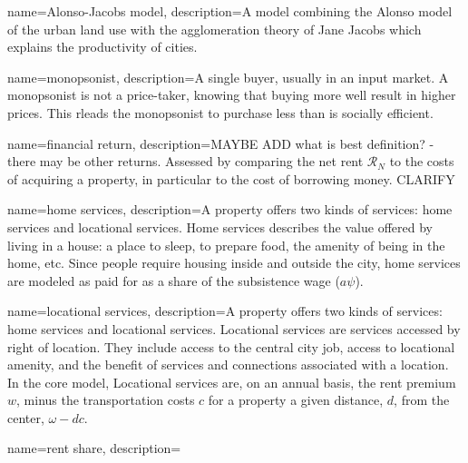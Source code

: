 
{
name=Alonso-Jacobs model,
description={A model combining the \gls{Alonso model} of the urban land use  \cite{alonsoModelUrbanLand1960} with the \gls{agglomeration} theory of Jane Jacobs \cite{jacobsEconomyCities1969} which explains the productivity of cities.}
}

{
name=monopsonist,
description={A single buyer, usually in an input market. A monopsonist is not a price-taker, knowing that buying more well result in  higher prices. This rleads the monopsonist to purchase less than is socially efficient.}
}

{
name=financial return,
description={MAYBE ADD what is best definition? - there may be other returns. Assessed by comparing the net rent $\mathcal{R}_N$ to the costs of acquiring a property, in particular to the cost of borrowing money. CLARIFY}
}

{
name=home services,
description={A property offers two kinds of services: home services and \gls{locational services}. Home services describes the value offered by living in a house: a place to sleep, to prepare food, the amenity of being in the home, etc. Since people require housing inside and outside the city, home services are modeled as paid for as a share of the subsistence wage ($a \psi$).}
}

{
name=locational services,
description={A property offers two kinds of services: \gls{home services} and locational services. Locational services are services accessed by right of location. They include access to the central city job, access to locational amenity, and the benefit of services and connections associated with a location. In the core model, Locational services are, on an annual basis, the rent premium $w$, minus the transportation costs $c$ for a property a given distance, $d$, from the center, $\omega- {dc}$.}
}

{
name=rent share,
description={}
}

